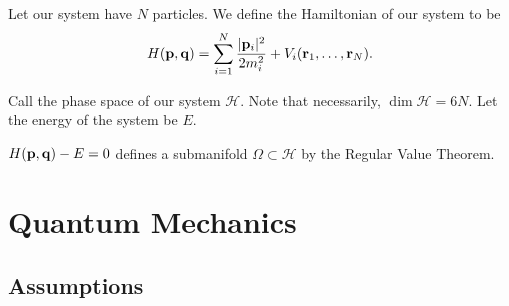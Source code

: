 \documentclass[11pt]{article}
\begin{document}
\begin{definition}
    Let our system have $N$ particles. We define the Hamiltonian of our system to be
    \begin{align*}
        H(\mathbf{p}, \mathbf{q}) = \sum_{i = 1}^{N} \frac{|\mathbf{p}_i|^2}{2m_i^2} + V_i(\mathbf{r}_1, \ldots, \mathbf{r}_{N}).
    \end{align*}
\end{definition}

\begin{definition}
    Call the phase space of our system $\mathcal{H}$. Note that necessarily,
    $\dim{\mathcal{H}} = 6N$. Let the energy of the system be $E$.
\end{definition}

$H(\mathbf{p}, \mathbf{q}) - E = 0$ defines a submanifold $\Omega \subset \mathcal{H}$
by the Regular Value Theorem.
\newpage

\section{Quantum Mechanics}

\subsection{Assumptions}
\end{document}
